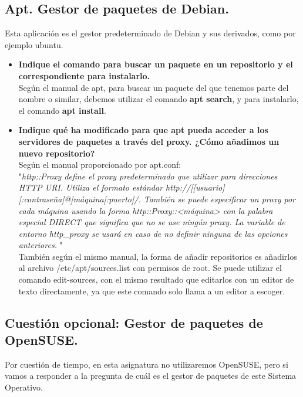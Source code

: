 \subsection{Apt. Gestor de paquetes de Debian.}
Esta aplicación es el gestor predeterminado de Debian y sus derivados, como por ejemplo ubuntu.
\begin{itemize}
	\item \textbf{Indique el comando para buscar un paquete en un repositorio y el correspondiente para instalarlo.}\\
	Según el manual de apt\cite{apt}, para buscar un paquete del que tenemos parte del nombre o similar, debemos utilizar el comando \textbf{apt search}, y para instalarlo, el comando \textbf{apt install}.\cite{b1}
	
	
	 \item \textbf{Indique qué ha modificado para que apt pueda acceder a los servidores de paquetes a través del proxy. ¿Cómo añadimos un nuevo repositorio?}\\
	 Según el manual proporcionado por apt.conf\cite{apt.conf}:\\
	 
	 "\textit{http::Proxy define el proxy predeterminado que utilizar para direcciones HTTP URI. Utiliza el formato estándar
	 	http://[[usuario][:contraseña]@]máquina[:puerto]/. También se puede especificar un proxy por cada máquina usando la forma
	 	http::Proxy::<máquina> con la palabra especial DIRECT que significa que no se use ningún proxy. La variable de entorno http\_proxy
	 	se usará en caso de no definir ninguna de las opciones anteriores.
	 }"\\
	 
	 También según el mismo manual, la forma de añadir repositorios es añadirlos al archivo /etc/apt/sources.list con permisos de root. Se puede utilizar el comando edit-sources, con el mismo resultado que editarlos con un editor de texto directamente, ya que este comando solo llama a un editor a escoger\cite{apt}.
	 
\end{itemize}

\subsection{Cuestión opcional: Gestor de paquetes de OpenSUSE.}
Por cuestión de tiempo, en esta asignatura no utilizaremos OpenSUSE, pero si vamos a responder a la pregunta de cuál es el gestor de paquetes de este Sistema Operativo.\\

